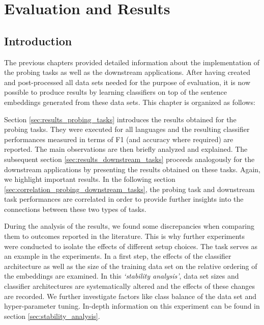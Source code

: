 %
%

\section{Evaluation and Results}
\label{sec:results_eval}

\subsection{Introduction}
\label{sec:results_eval_intro}

The previous chapters provided detailed information about the implementation of the probing tasks as well as the downstream applications. After having created and post-processed all data sets needed for the purpose of evaluation, it is now possible to produce results by learning classifiers on top of the sentence embeddings generated from these data sets. This chapter is organized as follows:

Section \vref{sec:results_probing_tasks} introduces the results obtained for the probing tasks. They were executed for all languages and the resulting classifier performances measured in terms of F1 (and accuracy where required) are reported. The main observations are then briefly analyzed and explained. The subsequent section \vref{sec:results_downstream_tasks} proceeds analogously for the downstream applications by presenting the results obtained on these tasks. Again, we highlight important results. In the following section \vref{sec:correlation_probing_downstream_tasks}, the probing task and downstream task performances are correlated in order to provide further insights into the connections between these two types of tasks.

During the analysis of the results, we found some discrepancies when comparing them to outcomes reported in the literature. This is why further experiments were conducted to isolate the effects of different setup choices. The  task serves as an example in the experiments. In a first step, the effects of the classifier architecture as well as the size of the training data set on the relative ordering of the embeddings are examined. In this \textit{`stability analysis'}, data set sizes and classifier architectures are systematically altered and the effects of these changes are recorded. We further investigate factors like class balance of the data set and hyper-parameter tuning. In-depth information on this experiment can be found in section \vref{sec:stability_analysis}.

